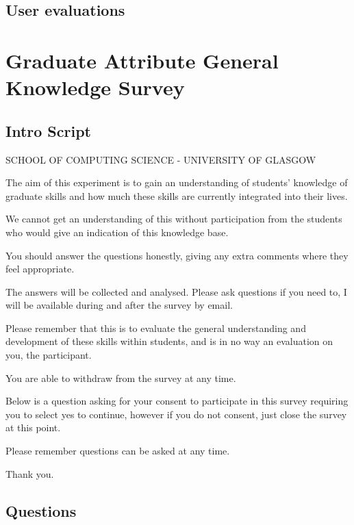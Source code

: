 \documentclass{l4proj}
\begin{document}
\begin{appendices}


\subsection{User evaluations}



\section{Graduate Attribute General Knowledge Survey} \label{Appendix-gradAttributeSurvey}

\subsection{Intro Script}

SCHOOL OF COMPUTING SCIENCE - UNIVERSITY OF GLASGOW

The aim of this experiment is to gain an understanding of students' knowledge of graduate skills and how much these skills are currently integrated into their lives. 

We cannot get an understanding of this without participation from the students who would give an indication of this knowledge base. 

You should answer the questions honestly, giving any extra comments where they feel appropriate.

The answers will be collected and analysed. Please ask questions if you need to, I will be available during and after the survey by email.

Please remember that this is to evaluate the general understanding and development of these skills within students, and is in no way an evaluation on you, the participant.

You are able to withdraw from the survey at any time.

Below is a question asking for your consent to participate in this survey requiring you to select yes to continue, however if you do not consent, just close the survey at this point.

Please remember questions can be asked at any time.

Thank you.

\subsection{Questions}


\end{appendices}
\end{document}

